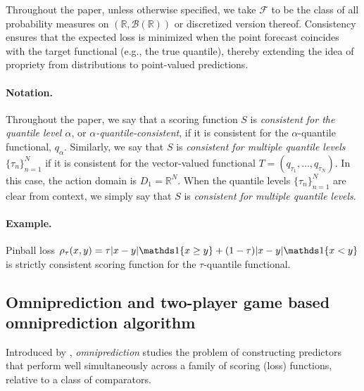 Throughout the paper, unless otherwise specified, we take $\mathcal{F}$ to be the class of all probability measures on $(\mathbb{R}, \mathcal{B}(\mathbb{R}))$ or discretized version thereof. Consistency ensures that the expected loss is minimized when the point forecast coincides with the target functional (e.g., the true quantile), thereby extending the idea of propriety from distributions to point-valued predictions. 

\paragraph{Notation.}
Throughout the paper, we say that a scoring function $S$ is \emph{consistent for the quantile level $\alpha$}, or \emph{$\alpha$-quantile-consistent}, if it is consistent for the $\alpha$-quantile functional, $q_\alpha$. Similarly, we say that $S$ is \emph{consistent for multiple quantile levels $\{\tau_n\}_{n=1}^N$} if it is consistent for the vector-valued functional $T = (q_{\tau_1}, \ldots, q_{\tau_N})$. In this case, the action domain is $D_1 = \mathbb{R}^N$. When the quantile levels $\{\tau_n\}_{n=1}^N$ are clear from context, we simply say that $S$ is \emph{consistent for multiple quantile levels}.

\paragraph{Example.} Pinball loss $\rho_\tau(x,y) = \tau |x-y|\indi{x \geq y} + (1-\tau) |x-y|\indi{x < y}$ is strictly consistent scoring function for the $\tau$-quantile functional.



\subsection{Omniprediction and two-player game based omniprediction algorithm}
Introduced by \cite{gopalan2022omnipredictors}, \emph{omniprediction} studies the problem of constructing predictors that perform well simultaneously across a family of scoring (loss) functions, relative to a class of comparators. 


